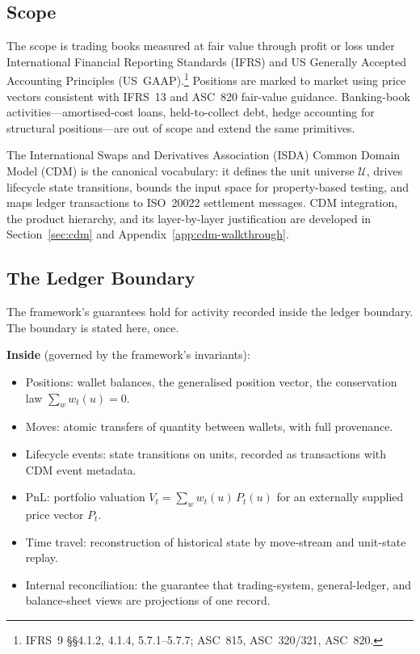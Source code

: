 \documentclass[11pt,a4paper]{article}
\begin{document}
\subsection{Scope}

The scope is trading books measured at fair value through profit or loss under International Financial Reporting Standards (IFRS) and US Generally Accepted Accounting Principles (US~GAAP).\footnote{IFRS~9 \S\S4.1.2, 4.1.4, 5.7.1--5.7.7; ASC~815, ASC~320/321, ASC~820.} Positions are marked to market using price vectors consistent with IFRS~13 and ASC~820 fair-value guidance. Banking-book activities---amortised-cost loans, held-to-collect debt, hedge accounting for structural positions---are out of scope and extend the same primitives.

The International Swaps and Derivatives Association (ISDA) Common Domain Model (CDM) is the canonical vocabulary: it defines the unit universe $\mathcal{U}$, drives lifecycle state transitions, bounds the input space for property-based testing, and maps ledger transactions to ISO~20022 settlement messages. CDM integration, the product hierarchy, and its layer-by-layer justification are developed in Section~\ref{sec:cdm} and Appendix~\ref{app:cdm-walkthrough}.

\subsection{The Ledger Boundary}
\label{sec:scope-overview}

The framework's guarantees hold for activity recorded inside the ledger boundary. The boundary is stated here, once.

\medskip
\noindent\textbf{Inside} (governed by the framework's invariants):
\begin{itemize}[nosep]
\item Positions: wallet balances, the generalised position vector, the conservation law $\sum_w w_t(u) = 0$.
\item Moves: atomic transfers of quantity between wallets, with full provenance.
\item Lifecycle events: state transitions on units, recorded as transactions with CDM event metadata.
\item PnL: portfolio valuation $V_t = \sum_w w_t(u)\,P_t(u)$ for an externally supplied price vector $P_t$.
\item Time travel: reconstruction of historical state by move-stream and unit-state replay.
\item Internal reconciliation: the guarantee that trading-system, general-ledger, and balance-sheet views are projections of one record.
\end{itemize}
\end{document}

